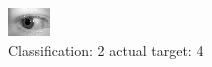 \begin{figure}[h!]
\begin{center}
\includegraphics[width=0.60\columnwidth]{figures/ID824_class_2_target_4.png}
\end{center}
\caption{ Classification: 2 actual target: 4}
\label{fig:ID824_class_2_target_4}
\end{figure}
